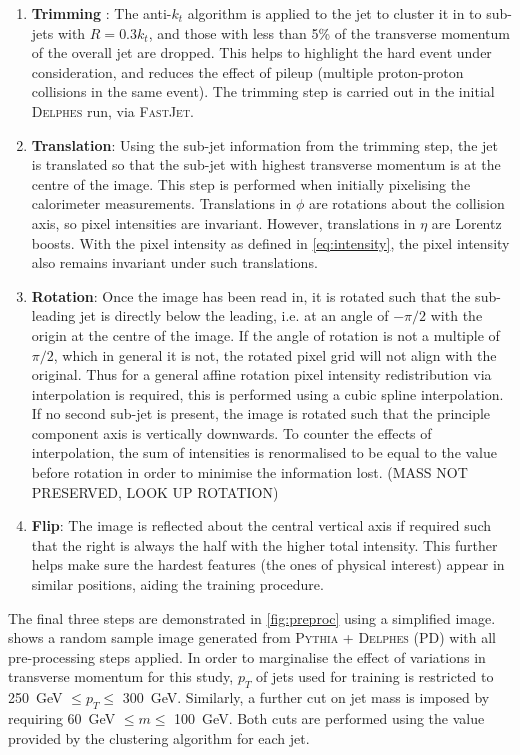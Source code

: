 \documentclass[twocolumn]{article}
\newcommand{\pkg}[1]{\textsc{#1}}
\begin{document}
\begin{enumerate}
	\item \textbf{Trimming} \cite{trimming}: The anti-$k_t$ algorithm is applied to the jet to cluster it in to sub-jets with $R = 0.3 k_t$, and those with less than 5\% of the transverse momentum of the overall jet are dropped. This helps to highlight the hard event under consideration, and reduces the effect of pileup (multiple proton-proton collisions in the same event). The trimming step is carried out in the initial \pkg{Delphes} run, via \pkg{FastJet}.
	
	
	\item \textbf{Translation}: Using the sub-jet information from the trimming step, the jet is translated so that the sub-jet with highest transverse momentum is at the centre of the image. This step is performed when initially pixelising the calorimeter measurements. Translations in $\phi$ are rotations about the collision axis, so pixel intensities are invariant. However, translations in $\eta$ are Lorentz boosts. With the pixel intensity as defined in \cref{eq:intensity}, the pixel intensity also remains invariant under such translations.
	\item \textbf{Rotation}: Once the image has been read in, it is rotated such that the sub-leading jet is directly below the leading, i.e. at an angle of $-\pi/2$ with the origin at the centre of the image. If the angle of rotation is not a multiple of $\pi/2$, which in general it is not, the rotated pixel grid will not align with the original. Thus for a general affine rotation pixel intensity redistribution via interpolation is required, this is performed using a cubic spline interpolation. If no second sub-jet is present, the image is rotated such that the principle component axis is vertically downwards. To counter the effects of interpolation, the sum of intensities is renormalised to be equal to the value before rotation in order to minimise the information lost. (MASS NOT PRESERVED, LOOK UP ROTATION)
	
	\item \textbf{Flip}:  The image is reflected about the central vertical axis if required such that the right is always the half with the higher total intensity. This further helps make sure the hardest features (the ones of physical interest) appear in similar positions, aiding the training procedure. 
	
\end{enumerate}

The final three steps are demonstrated in \cref{fig:preproc} using a simplified image.  shows a random sample image generated from \pkg{Pythia} + \pkg{Delphes} (PD) with all pre-processing steps applied. In order to marginalise the effect of variations in transverse momentum for this study, $p_T$ of jets used for training is restricted to \SI{250}{\giga\electronvolt} $\leq p_T \leq$ \SI{300}{\giga\electronvolt}. Similarly, a further cut on jet mass is imposed by requiring \SI{60}{\giga\electronvolt} $\leq m \leq$ \SI{100}{\giga\electronvolt}. Both cuts are performed using the value provided by the clustering algorithm for each jet.
\end{document}
